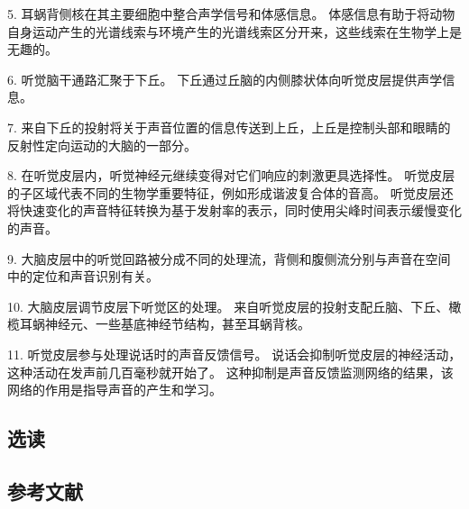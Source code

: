 5. 耳蜗背侧核在其主要细胞中整合声学信号和体感信息。 体感信息有助于将动物自身运动产生的光谱线索与环境产生的光谱线索区分开来，这些线索在生物学上是无趣的。 

6. 听觉脑干通路汇聚于下丘。 下丘通过丘脑的内侧膝状体向听觉皮层提供声学信息。 

7. 来自下丘的投射将关于声音位置的信息传送到上丘，上丘是控制头部和眼睛的反射性定向运动的大脑的一部分。 

8. 在听觉皮层内，听觉神经元继续变得对它们响应的刺激更具选择性。 听觉皮层的子区域代表不同的生物学重要特征，例如形成谐波复合体的音高。 听觉皮层还将快速变化的声音特征转换为基于发射率的表示，同时使用尖峰时间表示缓慢变化的声音。 

9. 大脑皮层中的听觉回路被分成不同的处理流，背侧和腹侧流分别与声音在空间中的定位和声音识别有关。 

10. 大脑皮层调节皮层下听觉区的处理。 来自听觉皮层的投射支配丘脑、下丘、橄榄耳蜗神经元、一些基底神经节结构，甚至耳蜗背核。 

11. 听觉皮层参与处理说话时的声音反馈信号。 说话会抑制听觉皮层的神经活动，这种活动在发声前几百毫秒就开始了。 这种抑制是声音反馈监测网络的结果，该网络的作用是指导声音的产生和学习。


\subsection{选读}
\subsection{参考文献}

